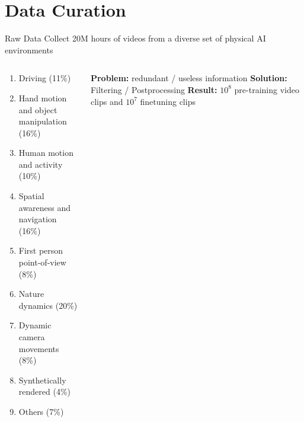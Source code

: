 \documentclass{beamer}
\begin{document}
\section{Data Curation}

\begin{frame}[t]{Raw Data}
    Collect 20M hours of videos from a diverse set of physical AI environments
    \begin{columns}
        \hspace{1em}
		\begin{column}{.5\textwidth}
            \small
            \begin{enumerate}[label=\arabic*., itemsep=0.5mm]
                \item Driving (11\%)
                \item Hand motion and object manipulation (16\%)
                \item Human motion and activity (10\%)
                \item Spatial awareness and navigation (16\%)
                \item First person point-of-view (8\%)
                \item Nature dynamics (20\%)
                \item Dynamic camera movements (8\%)
                \item Synthetically rendered (4\%)
                \item Others (7\%)
            \end{enumerate}
            \normalsize
		\end{column}
        \hspace{0em}
		\begin{column}{.5\textwidth}
            \textbf{Problem:} redundant / useless information \newline
            \textbf{Solution:} Filtering / Postprocessing \newline
            \textbf{Result:} $10^8$ pre-training video clips and $10^7$ finetuning clips 

		\end{column}
        \hspace{2em}
	\end{columns}
\end{frame}
\end{document}
